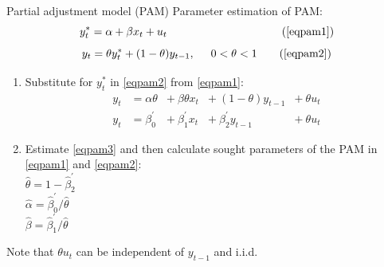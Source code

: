 \documentclass{beamer}
\begin{document}
\begin{frame}{Partial adjustment model (PAM)}
Parameter estimation of PAM:
\begin{equation*}
{y}_t^\ast = \alpha + \beta x_t + u_t ~~~~~~~~~~~~~~~~~~~~~~~~~ \tag{\ref{eqpam1}}
\end{equation*}
\vspace{-0.6cm}
\begin{equation*}
y_t= \theta {y}_t^\ast + (1-\theta)y_{t-1}, \hspace{0.5cm} 0 < \theta < 1 \tag{\ref{eqpam2}}
\end{equation*}
\begin{enumerate}
\item Substitute for $y_t^\ast$ in \eqref{eqpam2} from \eqref{eqpam1}:\\
\begin{equation}
\begin{aligned}
y_t &= \alpha \theta &+~ \beta \theta x_t &+~ (1-\theta) y_{t-1} &+~ \theta u_t \label{eqpam3}\\
y_t &= \beta_0^{\prime} &+~ \beta_1^{\prime} x_t &+~ \beta_2^{\prime} y_{t-1} &+~ \theta u_t
\end{aligned}
\end{equation}
\item Estimate \eqref{eqpam3} and then calculate sought parameters of the PAM in \eqref{eqpam1} and \eqref{eqpam2}:\\
\smallskip
$\hat{\theta}= 1-\hat{\beta}_2^{\prime}$\\
\smallskip
$\hat{\alpha} =\hat{\beta}_0^{\prime}/\hat{\theta}$\\
\smallskip
$\hat{\beta} =\hat{\beta}_1^{\prime}/\hat{\theta}$
\end{enumerate}
\medskip
\small{\qquad Note that $\theta u_t$ can be independent of $y_{t-1}$ and i.i.d.}
\end{frame}
\end{document}
